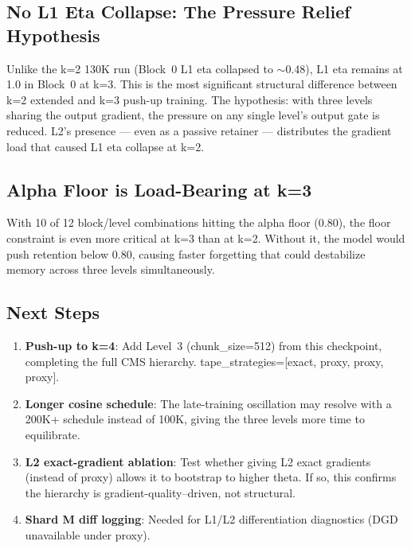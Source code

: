 \documentclass[11pt,a4paper]{article}
\begin{document}
\subsection{No L1 Eta Collapse: The Pressure Relief Hypothesis}

Unlike the k=2 130K run (Block~0 L1 eta collapsed to $\sim$0.48), L1 eta remains at 1.0 in Block~0
at k=3. This is the most significant structural difference between k=2 extended and k=3 push-up training.
The hypothesis: with three levels sharing the output gradient, the pressure on any single level's
output gate is reduced. L2's presence --- even as a passive retainer --- distributes the gradient
load that caused L1 eta collapse at k=2.

\subsection{Alpha Floor is Load-Bearing at k=3}

With 10 of 12 block/level combinations hitting the alpha floor (0.80), the floor constraint is even
more critical at k=3 than at k=2. Without it, the model would push retention below 0.80, causing
faster forgetting that could destabilize memory across three levels simultaneously.

\subsection{Next Steps}

\begin{enumerate}
    \item \textbf{Push-up to k=4}: Add Level~3 (chunk\_size=512) from this checkpoint, completing the
          full CMS hierarchy. tape\_strategies=[exact, proxy, proxy, proxy].
    \item \textbf{Longer cosine schedule}: The late-training oscillation may resolve with a 200K+ schedule
          instead of 100K, giving the three levels more time to equilibrate.
    \item \textbf{L2 exact-gradient ablation}: Test whether giving L2 exact gradients (instead of proxy)
          allows it to bootstrap to higher theta. If so, this confirms the hierarchy is gradient-quality--driven, not structural.
    \item \textbf{Shard M diff logging}: Needed for L1/L2 differentiation diagnostics (DGD unavailable under proxy).
\end{enumerate}
\end{document}
